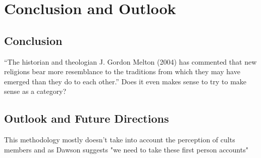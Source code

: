 \chapter{Conclusion and Outlook}

\section{Conclusion}



\enquote{The historian and theologian J. Gordon Melton (2004) has commented that new religions bear more resemblance to the traditions from which they may have emerged than they do to each other.}\autocite[pp.239]{barkerNotsonewReligiousMovements2014}
Does it even makes sense to try to make sense as a category?

\section{Outlook and Future Directions}
%


This methodology mostly doesn't take into account the perception of cults members and as Dawson suggests "we need to take these first person accounts" \autocite{extremebeliefsMatrixMethodologicalProblems2022}